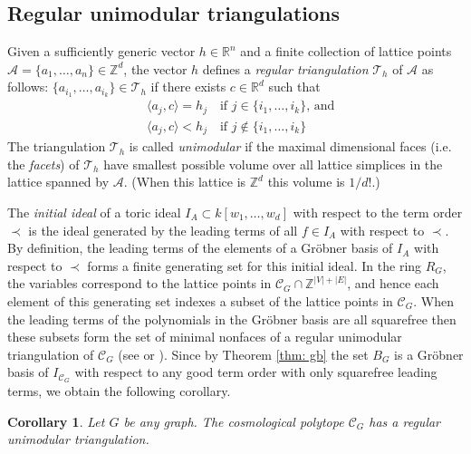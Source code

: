 \documentclass[11pt]{article}
\newtheorem{coro}[theo]{Corollary}
\theoremstyle{definition}
\numberwithin{equation}{section}
\begin{document}
\subsection{Regular unimodular triangulations}
\label{subsec: reg tri}
Given a sufficiently generic vector $h\in \mathbb{R}^n$ and a finite collection of lattice points $\mathcal{A}=\{a_1,\ldots,a_n\}\in \mathbb{Z}^d$, the vector $h$ defines a \emph{regular triangulation} $\mathcal{T}_h$ of $\mathcal{A}$ as follows: $\{a_{i_1},\ldots, a_{i_k}\}\in \mathcal{T}_h$ if there exists $c\in\mathbb{R}^d$ such that
\[
\begin{split}
    &\langle a_j, c\rangle = h_j \quad \mbox{if $j\in\{i_1,\ldots,i_k\}$, and}\\
    &\langle a_j, c\rangle < h_j \quad \mbox{if $j\notin\{i_1,\ldots,i_k\}$}
\end{split}
\]
The triangulation $\mathcal{T}_h$ is called \emph{unimodular} if the maximal dimensional faces (i.e. the \emph{facets}) of $\mathcal{T}_h$ have smallest possible volume over all lattice simplices in the lattice spanned by $\mathcal{A}$. (When this lattice is $\mathbb{Z}^d$ this volume is $1/d!$.)

The \emph{initial ideal} of a toric ideal $I_A\subset k[w_1,\ldots,w_d]$ with respect to the term order $\prec$ is the ideal generated by the leading terms of all $f\in I_A$ with respect to $\prec$. 
By definition, the leading terms of the elements of a Gr\"obner basis of $I_A$ with respect to $\prec$ forms a finite generating set for this initial ideal. 
In the ring $R_G$, the variables correspond to the lattice points in $\mathcal{C}_G \cap \mathbb{Z}^{|V|+|E|}$, and hence each element of this generating set indexes a subset of the lattice points in $\mathcal{C}_G$. 
When the leading terms of the polynomials in the Gr\"obner basis are all squarefree then these subsets form the set of minimal nonfaces of a regular unimodular triangulation of $\mathcal{C}_G$ (see \cite[Theorem 8.3]{sturmfels1996grobner} or \cite[Section 9.4]{DRS}). 
Since by Theorem \ref{thm: gb} the set $B_G$ is a Gr\"{o}bner basis of $I_{\mathcal{C}_G}$  with respect to any good term order with only squarefree leading terms, we obtain the following corollary.


\begin{coro}
\label{cor: triangulation}
    Let $G$ be any graph. The cosmological polytope $\mathcal{C}_G$ has a regular unimodular triangulation.
\end{coro}
\end{document}
